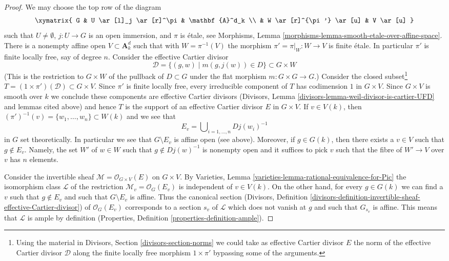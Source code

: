 \begin{proof}
\medskip\noindent
We may choose the top row of the diagram
$$
\xymatrix{
G & U \ar[l]_j \ar[r]^\pi & \mathbf{A}^d_k \\
& W \ar[r]^{\pi'} \ar[u] & V \ar[u]
}
$$
such that $U \not = \emptyset$, $j : U \to G$ is an open immersion, and
$\pi$ is \'etale, see
Morphisms, Lemma \ref{morphisms-lemma-smooth-etale-over-affine-space}.
There is a nonempty affine open $V \subset \mathbf{A}^d_k$ such that
with $W = \pi^{-1}(V)$ the morphism $\pi' = \pi|_W : W \to V$ is finite \'etale.
In particular $\pi'$ is finite locally free, say of degree $n$.
Consider the effective Cartier divisor
$$
\mathcal{D} = \{(g, w) \mid m(g, j(w)) \in D\} \subset G \times W
$$
(This is the restriction to $G \times W$ of the pullback of $D \subset G$
under the flat morphism $m : G \times G \to G$.)
Consider the closed subset\footnote{Using the material
in Divisors, Section \ref{divisors-section-norms}
we could take as effective Cartier
divisor $E$ the norm of the effective Cartier divisor $\mathcal{D}$
along the finite locally free morphism $1 \times \pi'$ bypassing
some of the arguments.}
$T = (1 \times \pi')(\mathcal{D}) \subset G \times V$.
Since $\pi'$ is finite locally free, every irreducible component
of $T$ has codimension $1$ in $G \times V$. Since $G \times V$
is smooth over $k$ we conclude these components are effective Cartier
divisors (Divisors, Lemma \ref{divisors-lemma-weil-divisor-is-cartier-UFD}
and lemmas cited above)
and hence $T$ is the support of an effective Cartier divisor
$E$ in $G \times V$. If $v \in V(k)$, then
$(\pi')^{-1}(v) = \{w_1, \ldots, w_n\} \subset W(k)$ and we see that
$$
E_v = \bigcup\nolimits_{i = 1, \ldots, n} D j(w_i)^{-1}
$$
in $G$ set theoretically. In particular we see that $G \setminus E_v$
is affine open (see above).
Moreover, if $g \in G(k)$, then there exists a $v \in V$
such that $g \not \in E_v$. Namely, the set $W'$ of $w \in W$ such that
$g \not \in Dj(w)^{-1}$ is nonempty open and it suffices to pick $v$
such that the fibre of $W' \to V$ over $v$ has $n$ elements.

\medskip\noindent
Consider the invertible sheaf
$\mathcal{M} = \mathcal{O}_{G \times V}(E)$ on $G \times V$.
By Varieties, Lemma \ref{varieties-lemma-rational-equivalence-for-Pic}
the isomorphism class $\mathcal{L}$ of the restriction
$\mathcal{M}_v = \mathcal{O}_G(E_v)$ is independent of $v \in V(k)$.
On the other hand, for every $g \in G(k)$ we can find a $v$
such that $g \not \in E_v$ and such that $G \setminus E_v$
is affine. Thus the canonical section
(Divisors, Definition
\ref{divisors-definition-invertible-sheaf-effective-Cartier-divisor})
of $\mathcal{O}_G(E_v)$
corresponds to a section $s_v$ of $\mathcal{L}$ which does not
vanish at $g$ and such that $G_{s_v}$ is affine.
This means that $\mathcal{L}$ is ample by definition
(Properties, Definition \ref{properties-definition-ample}).
\end{proof}


